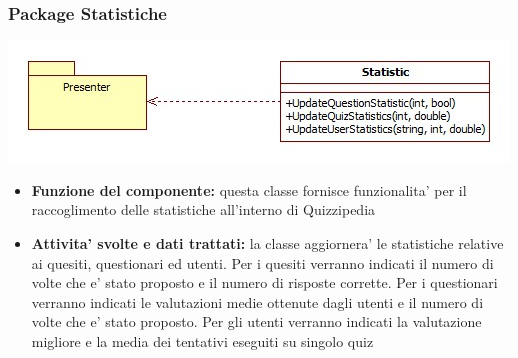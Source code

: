 			\subsubsection{Package Statistiche}
			\begin{center}
				\includegraphics[scale=0.6]{../images/Statistics.jpg}
			\end{center}
 			\begin{itemize}
		    	\item\textbf{Funzione del componente:} questa classe fornisce funzionalita' per il raccoglimento delle statistiche all'interno di Quizzipedia
			\item\textbf{Attivita' svolte e dati trattati:} la classe aggiornera' le statistiche relative ai quesiti, questionari ed utenti.
			Per i quesiti verranno indicati il numero di volte che e' stato proposto e il numero di risposte corrette.
			Per i questionari verranno indicati le valutazioni medie ottenute dagli utenti e il numero di volte che e' stato proposto.
			Per gli utenti verranno indicati la valutazione migliore e la media dei tentativi eseguiti su singolo quiz
			\end{itemize}
			
